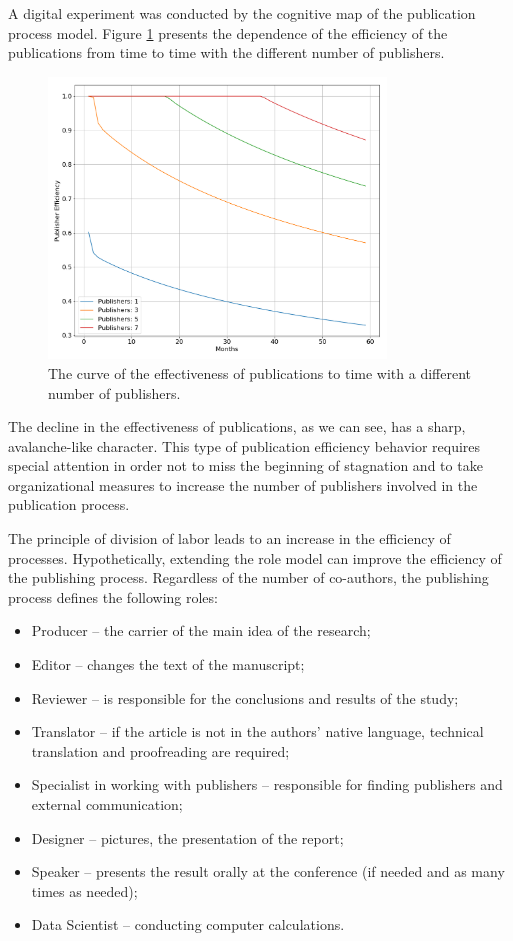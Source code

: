 \documentclass[12pt]{report}
\theoremstyle{definition}
\providecommand{\tightlist}{%
	\setlength{\itemsep}{0pt}\setlength{\parskip}{0pt}}
\begin{document}
A digital experiment was conducted by the cognitive map of the publication process model.
Figure \ref{fig:om7} presents the dependence of the efficiency of the publications from time to time with the different number of publishers.

\begin{figure}[ht]
	\centering
	\includegraphics[width=0.8\textwidth]{om7}
	\caption{The curve of the effectiveness of publications  to time with a different number of publishers.}
	\label{fig:om7}
\end{figure} 

The decline in the effectiveness of publications, as we can see, has a sharp, avalanche-like character. 
This type of publication efficiency behavior requires special attention in order not to miss the beginning of stagnation and to take organizational measures to increase the number of publishers involved in the publication process.  

The principle of division of labor leads to an increase in the efficiency of processes. 
Hypothetically, extending the role model can improve the efficiency of the publishing process. 
Regardless of the number of co-authors, the publishing process defines the following roles:

\begin{itemize}
	\tightlist
	\item Producer -- the carrier of the main idea of the research;
	\item Editor -- changes the text of the manuscript;
	\item Reviewer -- is responsible for the conclusions and results of the study;
	\item Translator -- if the article is not in the authors' native language, technical translation and proofreading are required;
	\item Specialist in working with publishers -- responsible for finding publishers and external communication;
	\item Designer -- pictures, the presentation of the report;
	\item Speaker -- presents the result orally at the conference (if needed and as many times as needed);
	\item Data Scientist -- conducting computer calculations.
\end{itemize}
\end{document}
